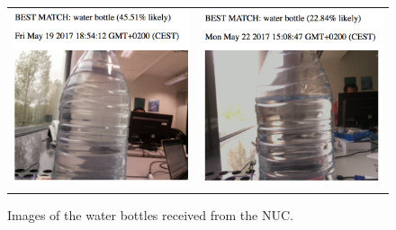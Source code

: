 \begin{figure}[H]
\begin{tabular}{cc}
		\\
		\includegraphics[scale=0.5]{images/water-bottle-3.png}
		&
		\includegraphics[scale=0.5]{images/water-bottle-4.png}
	\end{tabular}
	\caption{Images of the water bottles received from the NUC.}
	\label{fig:water-bottles}
\end{figure}




